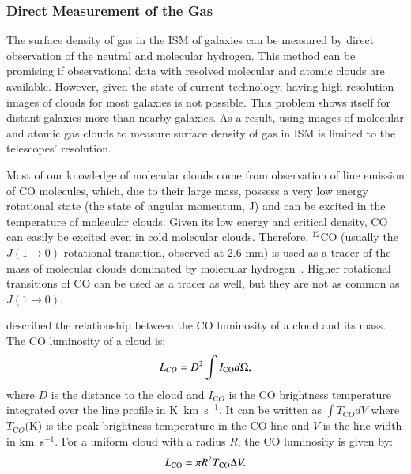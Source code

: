 \subsubsection{Direct Measurement of the Gas}

The surface density of gas in the ISM of galaxies can be measured by direct observation of the neutral and molecular hydrogen.
This method can be promising if observational data with resolved molecular and atomic clouds are available.
However, given the state of current technology, having high resolution images of clouds for most galaxies is not possible. 
This problem shows itself for distant galaxies more than nearby galaxies. 
As a result, using images of molecular and atomic gas clouds to measure surface density of gas in ISM is limited to the telescopes' resolution. 
 
Most of our knowledge of molecular clouds come from observation of line emission of CO molecules, which, due to their large mass, possess a very low energy rotational state (the state of angular momentum, J) and can be excited in the temperature of molecular clouds. %
Given its low energy and critical density, CO can easily be excited even in cold molecular clouds.
Therefore, $^{12}$CO (usually the $J(1\rightarrow 0)$ rotational transition, observed at 2.6 mm) is used as a tracer of the mass of molecular clouds dominated by molecular hydrogen~\citep[e.g.][]{Sanders84}.
Higher rotational transitions of CO can be used as a tracer as well, but they are not as common as $J(1\rightarrow 0)$.

\cite{Young91} described the relationship between the CO luminosity of a cloud and its mass. The CO luminosity of a cloud is:
\begin{equation}
L_{CO} = D^2 \int I_{\rm CO} d\Omega, 
\end{equation}
where $D$ is the distance to the cloud and $I_{\mathrm CO}$ is the CO brightness temperature integrated over the line profile in K~km~s$^{-1}$.
It can be written as ${\int T_{\mathrm CO} dV}$ where $T_{\mathrm CO}$(K) is the peak brightness temperature in the CO line and $V$ is the line-width in km~s$^{-1}$. %
For a uniform cloud with a radius $R$, the CO luminosity is given by:
 \begin{equation}
L_{\rm CO} = \pi R^2 T_{\rm CO} \Delta V.
\end{equation}

